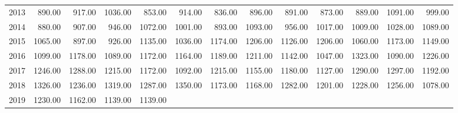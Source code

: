 \begin{longtable}{rrrrrrrrrrrrr}
  2013 & 890.00 & 917.00 & 1036.00 & 853.00 & 914.00 & 836.00 & 896.00 & 891.00 & 873.00 & 889.00 & 1091.00 & 999.00 \\ 
  2014 & 880.00 & 907.00 & 946.00 & 1072.00 & 1001.00 & 893.00 & 1093.00 & 956.00 & 1017.00 & 1009.00 & 1028.00 & 1089.00 \\ 
  2015 & 1065.00 & 897.00 & 926.00 & 1135.00 & 1036.00 & 1174.00 & 1206.00 & 1126.00 & 1206.00 & 1060.00 & 1173.00 & 1149.00 \\ 
  2016 & 1099.00 & 1178.00 & 1089.00 & 1172.00 & 1164.00 & 1189.00 & 1211.00 & 1142.00 & 1047.00 & 1323.00 & 1090.00 & 1226.00 \\ 
  2017 & 1246.00 & 1288.00 & 1215.00 & 1172.00 & 1092.00 & 1215.00 & 1155.00 & 1180.00 & 1127.00 & 1290.00 & 1297.00 & 1192.00 \\ 
  2018 & 1326.00 & 1236.00 & 1319.00 & 1287.00 & 1350.00 & 1173.00 & 1168.00 & 1282.00 & 1201.00 & 1228.00 & 1256.00 & 1078.00 \\ 
  2019 & 1230.00 & 1162.00 & 1139.00 & 1139.00 &  &  &  &  &  &  &  &  \\ 
   \hline
\hline
\end{longtable}
